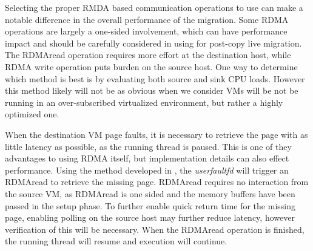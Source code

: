 Selecting the proper RMDA based communication operations to use can make a notable difference in the overall performance of the migration.  
Some RDMA operations are largely a one-sided involvement, which can have performance impact and should be carefully considered in using for post-copy live migration. The RDMAread operation requires more effort at the destination host, while RDMA write operation puts burden on the source host.  One way to determine which method is best is by evaluating both source and sink CPU loads.  However this method likely will not be as obvious when we consider VMs will be not be running in an over-subscribed virtualized environment, but rather a highly optimized one. 

When the destination VM page faults, it is necessary to retrieve the page with as little latency as possible, as the running thread is paused. This is one of they advantages to using RDMA itself, but implementation details can also effect performance. Using the method developed in \cite{www-kvm-postcopy}, the \emph{userfaultfd} will trigger an RDMAread to retrieve the missing page. RDMAread requires no interaction from the source VM, as RDMAread is one sided and the memory buffers have been passed in the setup phase. To further enable quick return time for the missing page, enabling polling on the source host may further reduce latency, however verification of this will be necessary. When the RDMAread operation is finished, the running thread will resume and execution will continue.








